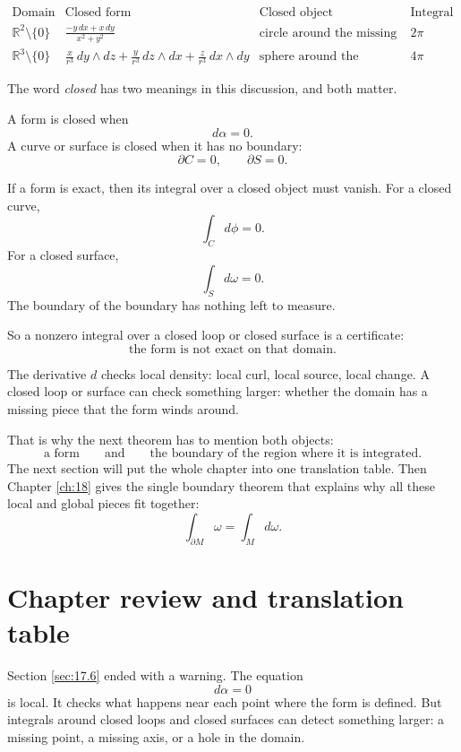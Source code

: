 \[
\begin{array}{c|c|c|c}
\text{Domain} & \text{Closed form} & \text{Closed object} & \text{Integral} \\ \hline
\mathbb R^2\setminus\{0\}
&
\displaystyle
\frac{-y\,dx+x\,dy}{x^2+y^2}
&
\text{circle around the missing point}
&
2\pi
\\[4mm]
\mathbb R^3\setminus\{0\}
&
\displaystyle
\frac{x}{r^3}\,dy\wedge dz+
\frac{y}{r^3}\,dz\wedge dx+
\frac{z}{r^3}\,dx\wedge dy
&
\text{sphere around the missing point}
&
4\pi
\end{array}
\]

The word \emph{closed} has two meanings in this discussion, and both matter.

A form is closed when
\[
    d\alpha=0.
\]
A curve or surface is closed when it has no boundary:
\[
    \partial C=0,
    \qquad
    \partial S=0.
\]

If a form is exact, then its integral over a closed object must vanish.  For a closed
curve,
\[
    \int_C d\phi=0.
\]
For a closed surface,
\[
    \int_S d\omega=0.
\]
The boundary of the boundary has nothing left to measure.

So a nonzero integral over a closed loop or closed surface is a certificate:
\[
\boxed{
    \text{the form is not exact on that domain.}
}
\]

The derivative \(d\) checks local density: local curl, local source, local change.  A
closed loop or surface can check something larger: whether the domain has a missing
piece that the form winds around.

That is why the next theorem has to mention both objects:
\[
    \text{a form}
    \qquad\text{and}\qquad
    \text{the boundary of the region where it is integrated.}
\]
The next section will put the whole chapter into one translation table.  Then Chapter
\ref{ch:18} gives the single boundary theorem that explains why all these local and
global pieces fit together:
\[
    \int_{\partial M}\omega=\int_M d\omega.
\]
\section{Chapter review and translation table}
\label{sec:17.7}

Section \ref{sec:17.6} ended with a warning.  The equation
\[
    d\alpha=0
\]
is local.  It checks what happens near each point where the form is defined.  But
integrals around closed loops and closed surfaces can detect something larger:
a missing point, a missing axis, or a hole in the domain.

